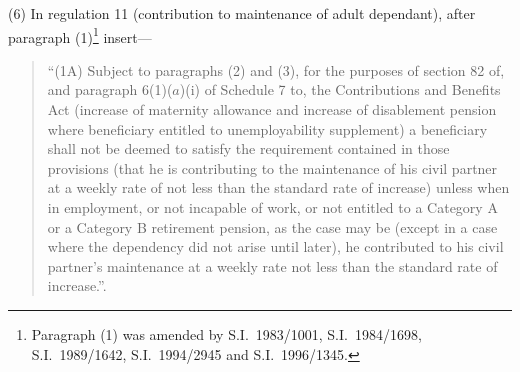\documentclass[12pt,a4paper]{article}
\begin{document}
(6) In regulation 11 (contribution to maintenance of adult dependant), after paragraph (1)\footnote{Paragraph (1) was amended by S.I.\ 1983/1001, S.I.\ 1984/1698, S.I.\ 1989/1642, S.I.\ 1994/2945 and S.I.\ 1996/1345.} insert—
\begin{quotation}
“(1A) Subject to paragraphs (2) and (3), for the purposes of section 82 of, and paragraph 6(1)($a$)(i)  of Schedule 7 to, the Contributions and Benefits Act (increase of maternity allowance and increase of disablement pension where beneficiary entitled to unemployability supplement) a beneficiary shall not be deemed to satisfy the requirement contained in those provisions (that he is contributing to the maintenance of his civil partner at a weekly rate of not less than the standard rate of increase) unless when in employment, or not incapable of work, or not entitled to a Category A or a Category B retirement pension, as the case may be (except in a case where the dependency did not arise until later), he contributed to his civil partner’s maintenance at a weekly rate not less than the standard rate of increase.”.
\end{quotation}
\end{document}
